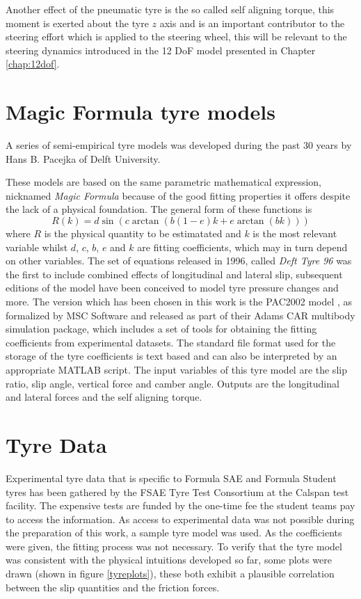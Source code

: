 Another effect of the pneumatic tyre is the so called self aligning torque, this moment is exerted about the tyre $z$ axis and is an important contributor to the steering effort which is applied to the steering wheel, this will be relevant to the steering dynamics introduced in the 12 DoF model presented in Chapter \ref{chap:12dof}.

\section{Magic Formula tyre models}
\label{sec:mf}
A series of semi-empirical tyre models was developed during the past 30 years by Hans B. Pacejka of Delft University.

These models are based on the same parametric mathematical expression, nicknamed \textit{Magic Formula} because of the good fitting properties it offers despite the lack of a physical foundation. The general form of these functions is
$$ R(k) = d\sin(c\arctan(b(1-e)k+e\arctan(bk))) $$
where $R$ is the physical quantity to be estimatated and $k$ is the most relevant variable whilst $d$, $c$, $b$, $e$ and $k$ are fitting coefficients, which may in turn depend on other variables.
The set of equations released in 1996, called \textit{Deft Tyre 96} \cite{pac96} was the first to include combined effects of longitudinal and lateral slip, subsequent editions of the model have been conceived to model tyre pressure changes \cite{pac10} and more.
The version which has been chosen in this work is the PAC2002 model \cite{pac2002}, as formalized by MSC Software and released as part of their Adams CAR multibody simulation package, which includes a set of tools for obtaining the fitting coefficients from experimental datasets. The standard file format used for the storage of the tyre coefficients is text based and can also be interpreted by an appropriate MATLAB script\cite{loadtir}.
The input variables of this tyre model are the slip ratio, slip angle, vertical force and camber angle. Outputs are the longitudinal and lateral forces and the self aligning torque.

\section{Tyre Data}
\label{sec:tyredata}

Experimental tyre data that is specific to Formula SAE and Formula Student tyres has been gathered by the FSAE Tyre Test Consortium at the Calspan test facility. The expensive tests are funded by the one-time fee the student teams pay to access the information.
As access to experimental data was not possible during the preparation of this work, a sample tyre model was used. As the coefficients were given, the fitting process was not necessary.
To verify that the tyre model was consistent with the physical intuitions developed so far, some plots were drawn (shown in figure \ref{tyreplots}), these both exhibit a plausible correlation between the slip quantities and the friction forces.

